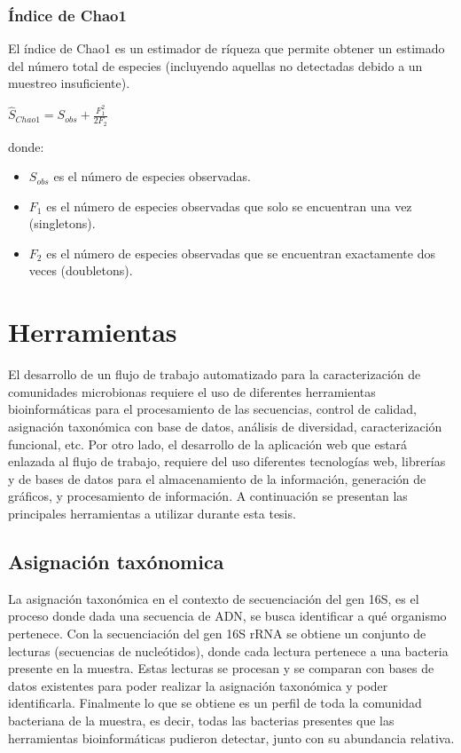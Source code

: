 \subsubsection{Índice de Chao1}
El índice de Chao1 es un estimador de ríqueza que permite obtener un estimado del número total de especies (incluyendo aquellas no detectadas debido a un muestreo insuficiente).
\begin{center}
    \begin{math}
\hat{S}_{Chao1} = S_{obs} + \frac{F_1^2}{2F_2}
\end{math}
\end{center}
donde:
\begin{itemize}
    \item $S_{obs}$ es el número de especies observadas.
    \item $F_1$ es el número de especies observadas que solo se encuentran una vez (singletons).
    \item $F_2$ es el número de especies observadas que se encuentran exactamente dos veces (doubletons).
\end{itemize}
\section{Herramientas}
El desarrollo de un flujo de trabajo automatizado para la caracterización de comunidades microbionas requiere el uso de diferentes herramientas bioinformáticas para el procesamiento de las secuencias, control de calidad, asignación taxonómica con base de datos, análisis de diversidad, caracterización funcional, etc. Por otro lado, el desarrollo de la aplicación web que estará enlazada al flujo de trabajo, requiere del uso diferentes tecnologías web, librerías y de bases de datos para el almacenamiento de la información, generación de gráficos, y procesamiento de información. A continuación se presentan las principales herramientas a utilizar durante esta tesis.
\subsection{Asignación taxónomica}
La asignación taxonómica en el contexto de secuenciación del gen 16S, es el proceso donde dada una secuencia de ADN, se busca identificar a qué organismo pertenece.
Con la secuenciación del gen 16S rRNA se obtiene un conjunto de lecturas (secuencias de nucleótidos), donde cada lectura pertenece a una bacteria presente en la muestra. 
Estas lecturas se procesan y se comparan con bases de datos existentes para poder realizar la asignación taxonómica y poder identificarla. 
Finalmente lo que se obtiene es un perfil de toda la comunidad bacteriana de la muestra, es decir, todas las bacterias presentes que las herramientas bioinformáticas pudieron detectar, junto con su abundancia relativa.


